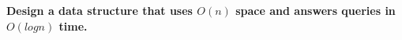 \textbf{Design a data structure that uses $O(n)$ space and answers queries in $O(log n)$ time.}\vspace{.2cm}

\textcolor{bibi}{}
\begin{quote}
\end{quote}